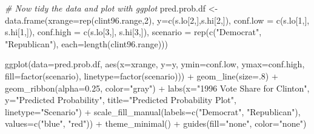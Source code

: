 \documentclass[
]{article}
\newenvironment{Shaded}{\begin{snugshade}}{\end{snugshade}}
\newcommand{\AttributeTok}[1]{\textcolor[rgb]{0.77,0.63,0.00}{#1}}
\newcommand{\CommentTok}[1]{\textcolor[rgb]{0.56,0.35,0.01}{\textit{#1}}}
\newcommand{\DecValTok}[1]{\textcolor[rgb]{0.00,0.00,0.81}{#1}}
\newcommand{\FloatTok}[1]{\textcolor[rgb]{0.00,0.00,0.81}{#1}}
\newcommand{\FunctionTok}[1]{\textcolor[rgb]{0.00,0.00,0.00}{#1}}
\newcommand{\NormalTok}[1]{#1}
\newcommand{\OtherTok}[1]{\textcolor[rgb]{0.56,0.35,0.01}{#1}}
\newcommand{\SpecialCharTok}[1]{\textcolor[rgb]{0.00,0.00,0.00}{#1}}
\newcommand{\StringTok}[1]{\textcolor[rgb]{0.31,0.60,0.02}{#1}}
\begin{document}
\begin{Shaded}
\begin{Highlighting}[]
\CommentTok{\# Now tidy the data and plot with ggplot}
\NormalTok{pred.prob.df }\OtherTok{\textless{}{-}} \FunctionTok{data.frame}\NormalTok{(}\AttributeTok{xrange=}\FunctionTok{rep}\NormalTok{(clint96.range,}\DecValTok{2}\NormalTok{), }
                           \AttributeTok{y=}\FunctionTok{c}\NormalTok{(s.lo[}\DecValTok{2}\NormalTok{,],s.hi[}\DecValTok{2}\NormalTok{,]),}
                           \AttributeTok{conf.low =} \FunctionTok{c}\NormalTok{(s.lo[}\DecValTok{1}\NormalTok{,], s.hi[}\DecValTok{1}\NormalTok{,]),}
                           \AttributeTok{conf.high =} \FunctionTok{c}\NormalTok{(s.lo[}\DecValTok{3}\NormalTok{,], s.hi[}\DecValTok{3}\NormalTok{,]),}
                           \AttributeTok{scenario =} \FunctionTok{rep}\NormalTok{(}\FunctionTok{c}\NormalTok{(}\StringTok{"Democrat"}\NormalTok{, }\StringTok{"Republican"}\NormalTok{), }
                                          \AttributeTok{each=}\FunctionTok{length}\NormalTok{(clint96.range)))}

\FunctionTok{ggplot}\NormalTok{(}\AttributeTok{data=}\NormalTok{pred.prob.df, }\FunctionTok{aes}\NormalTok{(}\AttributeTok{x=}\NormalTok{xrange, }\AttributeTok{y=}\NormalTok{y,}
                              \AttributeTok{ymin=}\NormalTok{conf.low,}
                              \AttributeTok{ymax=}\NormalTok{conf.high,}
                              \AttributeTok{fill=}\FunctionTok{factor}\NormalTok{(scenario),}
                              \AttributeTok{linetype=}\FunctionTok{factor}\NormalTok{(scenario))) }\SpecialCharTok{+}
  \FunctionTok{geom\_line}\NormalTok{(}\AttributeTok{size=}\NormalTok{.}\DecValTok{8}\NormalTok{) }\SpecialCharTok{+}
  \FunctionTok{geom\_ribbon}\NormalTok{(}\AttributeTok{alpha=}\FloatTok{0.25}\NormalTok{, }\AttributeTok{color=}\StringTok{"gray"}\NormalTok{) }\SpecialCharTok{+}
  \FunctionTok{labs}\NormalTok{(}\AttributeTok{x=}\StringTok{"1996 Vote Share for Clinton"}\NormalTok{, }\AttributeTok{y=}\StringTok{"Predicted Probability"}\NormalTok{,}
       \AttributeTok{title=}\StringTok{"Predicted Probability Plot"}\NormalTok{, }\AttributeTok{linetype=}\StringTok{"Scenario"}\NormalTok{) }\SpecialCharTok{+}
  \FunctionTok{scale\_fill\_manual}\NormalTok{(}\AttributeTok{labels=}\FunctionTok{c}\NormalTok{(}\StringTok{"Democrat"}\NormalTok{, }\StringTok{"Republican"}\NormalTok{), }
                    \AttributeTok{values=}\FunctionTok{c}\NormalTok{(}\StringTok{"blue"}\NormalTok{, }\StringTok{"red"}\NormalTok{)) }\SpecialCharTok{+}
  \FunctionTok{theme\_minimal}\NormalTok{() }\SpecialCharTok{+}
  \FunctionTok{guides}\NormalTok{(}\AttributeTok{fill=}\StringTok{"none"}\NormalTok{, }\AttributeTok{color=}\StringTok{"none"}\NormalTok{)}
\end{Highlighting}
\end{Shaded}
\end{document}
